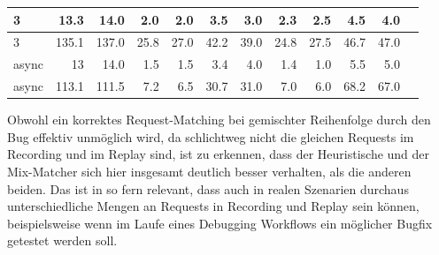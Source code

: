 \documentclass[12pt,a4paper]{report}
\begin{document}
\begin{table}[H]
\begin{tabular}{|l|r|r|r|r|r|r|r|r|r|r|r|}
		3                        & 13.3                               & 14.0                            & 2.0                         & 2.0                       & 3.5                            & 3.0  & 2.3  & 2.5  & 4.5  & 4.0  \\ \hline
		3                        & 135.1                              & 137.0                           & 25.8                        & 27.0                      & 42.2                           & 39.0 & 24.8 & 27.5 & 46.7 & 47.0 \\ \hline
		async                    & 13                                 & 14.0                            & 1.5                         & 1.5                       & 3.4                            & 4.0  & 1.4  & 1.0  & 5.5  & 5.0  \\ \hline
		async                    & 113.1                              & 111.5                           & 7.2                         & 6.5                       & 30.7                           & 31.0 & 7.0  & 6.0  & 68.2 & 67.0 \\ \hline
	\end{tabular}
\end{table}

Obwohl ein korrektes Request-Matching bei gemischter Reihenfolge durch den Bug effektiv unmöglich wird, da schlichtweg nicht die
gleichen Requests im Recording und im Replay sind, ist zu erkennen, dass der Heuristische und der Mix-Matcher sich hier insgesamt
deutlich besser verhalten, als die anderen beiden. Das ist in so fern relevant, dass auch in realen Szenarien durchaus
unterschiedliche Mengen an Requests in Recording und Replay sein können, beispielsweise wenn im Laufe eines Debugging Workflows
ein möglicher Bugfix getestet werden soll.
\end{document}
